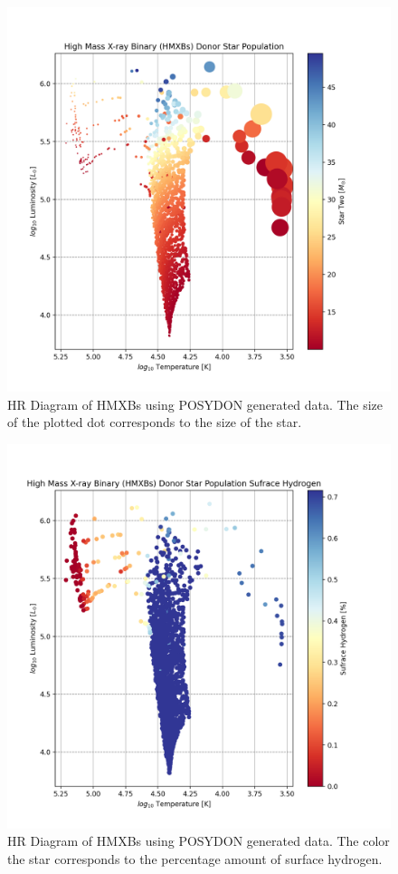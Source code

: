 \documentclass[12pt, a4paper]{article}
\begin{document}
            
        \begin{figure}[H] 
            \centering
            \includegraphics[width=\textwidth]{figs/GeneratedFigs/VelaX-1/HMXBHRPopulation.png}
            \caption{HR Diagram of HMXBs using POSYDON generated data. The size of the plotted dot corresponds to the size of the star.}
            \label{HMXBsHRDiagram}
        \end{figure}

        \begin{figure}[H] 
            \centering
            \includegraphics[width=\textwidth]{figs/GeneratedFigs/VelaX-1/HMXBsSurfaceCompHRDiagram.png}
            \caption{HR Diagram of HMXBs using POSYDON generated data. The color the star corresponds to the percentage amount of surface hydrogen.}
            \label{HMXBsSurfaceCompHRDiagram}
        \end{figure}
\end{document}
